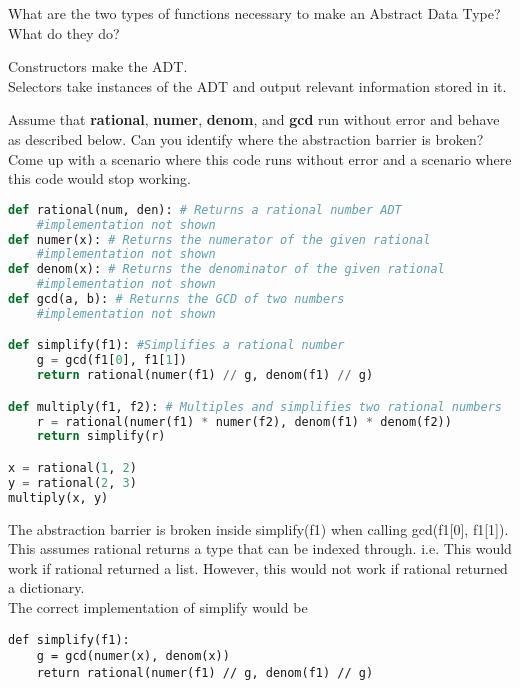 
\question
What are the two types of functions necessary to make an Abstract Data Type? What do they do?

\begin{solution}[0.25in]
Constructors make the ADT.\\
Selectors take instances of the ADT and output relevant information stored in it.
\end{solution}

\question
Assume that \textbf{rational}, \textbf{numer}, \textbf{denom}, and \textbf{gcd} run without error and behave as described below. Can you identify where the abstraction barrier is broken? Come up with a scenario where this code runs without error and a scenario where this code would stop working.

\begin{lstlisting}[language=Python]
def rational(num, den): # Returns a rational number ADT
    #implementation not shown
def numer(x): # Returns the numerator of the given rational
    #implementation not shown
def denom(x): # Returns the denominator of the given rational
    #implementation not shown
def gcd(a, b): # Returns the GCD of two numbers
    #implementation not shown

def simplify(f1): #Simplifies a rational number
    g = gcd(f1[0], f1[1])
    return rational(numer(f1) // g, denom(f1) // g)

def multiply(f1, f2): # Multiples and simplifies two rational numbers
    r = rational(numer(f1) * numer(f2), denom(f1) * denom(f2))
    return simplify(r)

x = rational(1, 2)
y = rational(2, 3)
multiply(x, y)
\end{lstlisting}

\begin{solution}
The abstraction barrier is broken inside simplify(f1) when calling gcd(f1[0], f1[1]). This assumes rational returns a type that can be indexed through. i.e. This would work if rational returned a list. However, this would not work if rational returned a dictionary.\\

The correct implementation of simplify would be\\
\begin{verbatim}
def simplify(f1): 
    g = gcd(numer(x), denom(x))
    return rational(numer(f1) // g, denom(f1) // g)
\end{verbatim}
\end{solution}

